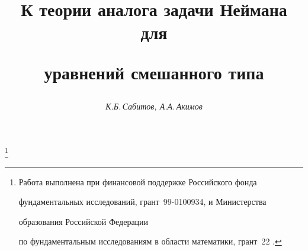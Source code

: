 

 




\newcommand{\const}{\operatorname{const}} 


\newcommand{\sgn}{\operatorname{sgn}} 


\newcommand{\tts}[1]{} 


 




\setcounter{page}{73} 












 


\author{\it К.Б.\,Сабитов, А.А.\,Акимов} 




\title{К теории аналога задачи Неймана\\ для  


уравнений смешанного типа} 


\thanks{Работа выполнена при финансовой поддержке Российского фонда 


фундаментальных исследований, грант \No\,99-0100934, и Министерства


образования Российской Федерации 


по фундаментальным исследованиям в области математики, грант \No\,22 .} 


 


\date{} 




\pagestyle{plain} %


